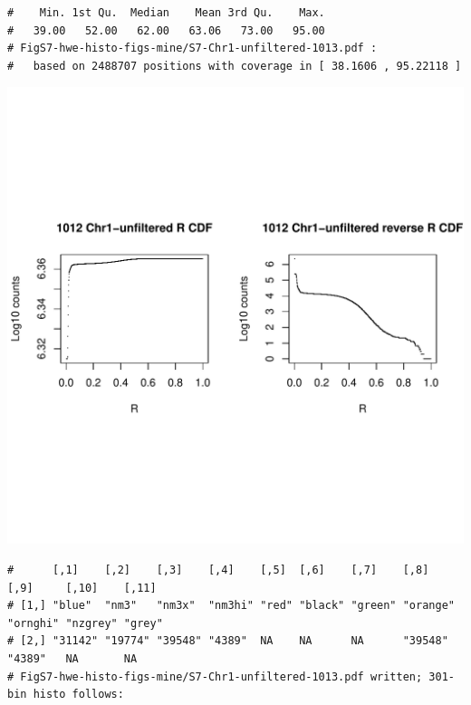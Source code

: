 \documentclass{article}\usepackage[]{graphicx}\usepackage[]{color}
\makeatletter
\def\maxwidth{ %
  \ifdim\Gin@nat@width>\linewidth
    \linewidth
  \else
    \Gin@nat@width
  \fi
}
\newenvironment{kframe}{%
 \def\at@end@of@kframe{}%
 \ifinner\ifhmode%
  \def\at@end@of@kframe{\end{minipage}}%
  \begin{minipage}{\columnwidth}%
 \fi\fi%
 \def\FrameCommand##1{\hskip\@totalleftmargin \hskip-\fboxsep
 \colorbox{shadecolor}{##1}\hskip-\fboxsep
     \hskip-\linewidth \hskip-\@totalleftmargin \hskip\columnwidth}%
 \MakeFramed {\advance\hsize-\width
   \@totalleftmargin\z@ \linewidth\hsize
   \@setminipage}}%
 {\par\unskip\endMakeFramed%
 \at@end@of@kframe}
\newenvironment{knitrout}{}{} %
\makeatother
\begin{document}
\begin{knitrout}
\begin{kframe}
\begin{verbatim}
#    Min. 1st Qu.  Median    Mean 3rd Qu.    Max. 
#   39.00   52.00   62.00   63.06   73.00   95.00 
# FigS7-hwe-histo-figs-mine/S7-Chr1-unfiltered-1013.pdf :
#   based on 2488707 positions with coverage in [ 38.1606 , 95.22118 ]
\end{verbatim}
\end{kframe}
\includegraphics[width=\maxwidth]{FigS7-hwe-histo-figs-knitr/unnamed-chunk-10-18} 
\begin{kframe}\begin{verbatim}
#      [,1]    [,2]    [,3]    [,4]    [,5]  [,6]    [,7]    [,8]     [,9]     [,10]    [,11] 
# [1,] "blue"  "nm3"   "nm3x"  "nm3hi" "red" "black" "green" "orange" "ornghi" "nzgrey" "grey"
# [2,] "31142" "19774" "39548" "4389"  NA    NA      NA      "39548"  "4389"   NA       NA    
# FigS7-hwe-histo-figs-mine/S7-Chr1-unfiltered-1013.pdf written; 301-bin histo follows:
\end{verbatim}
\end{kframe}

\end{knitrout}
\end{document}
